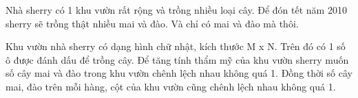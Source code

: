 Nhà sherry có 1 khu vườn rất rộng và trồng nhiều loại cây. Để đón tết năm 2010 sherry sẽ trồng thật nhiều mai và đào. Và chỉ có mai và đào mà thôi.  

   Khu vườn nhà sherry có dạng hình chữ nhật, kích thước M x N. Trên đó có 1 số ô được đánh dấu để trồng cây. Để tăng tính thẩm mỹ của khu vườn sherry muốn số cây mai và đào trong khu vườn chênh lệch nhau không quá 1. Đồng thời số cây mai, đào trên mỗi hàng, cột của khu vườn cũng chênh lệch nhau không quá 1.